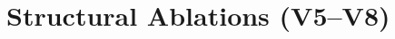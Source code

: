 \section{Structural Ablations (V5--V8)}
\label{sec:appendix_ablations}

\begin{table}[h]
\centering
\caption{Structural ablation: removing components or enforcing Helmholtz structure
  at initialisation.  $d=768$, 12$\times$1, 30k steps.}
\label{tab:v5_v8}
\resizebox{0.7\textwidth}{!}{%
}
\end{table}

